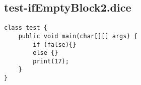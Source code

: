 \subsection{test-ifEmptyBlock2.dice}
\begin{verbatim}
class test {
	public void main(char[][] args) {
  		if (false){}
  		else {}
  		print(17);
	}
}

\end{verbatim}